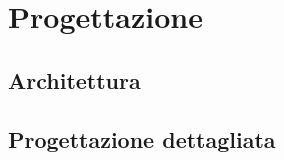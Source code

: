 \chapter{Progettazione}
\label{chap:progettazione}
    \section{Architettura}
    \label{sec:architettura}
    \section{Progettazione dettagliata}
    \label{sec:progettazione_dettagliata}
